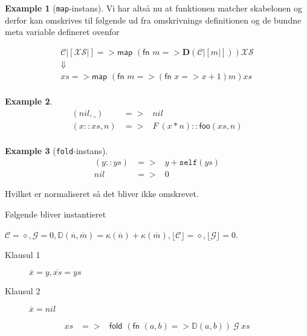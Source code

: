 \documentclass[oneside]{memoir}
\newcommand{\floor}[1]{\ensuremath{\lfloor #1 \rfloor}}
\theoremstyle{definition}
\newtheorem{example}{Example}
\begin{document}
\begin{example}[\texttt{map}-instans]
  Vi har altså nu at funktionen matcher skabelonen og derfor kan omskrives til
  følgende ud fra omskrivnings definitionen og de bundne meta variable defineret
  ovenfor

  \begin{eqnarray*}[c]
      \mathcal{C}|[\mathcal{X\!S}|] => \textsf{map } \left( \textsf{fn } m =>
    \mathbf{D}\left( \mathcal{C}|[m|] \right) \right) \mathcal{X\!S} \\
  \Downarrow \\
  xs => \textsf{map } \left( \textsf{fn } m =>
    \left( \textsf{fn } x => x + 1 \right) m \right) xs \\
  \end{eqnarray*}

\end{example}


\begin{example}
  \begin{eqnarray*}
    (nil, \_) &=>& nil\\
    (x::xs, n) &=>& F\ (x * n) :: \mathsf{foo} (xs, n)\\
  \end{eqnarray*}
\end{example}

\begin{example}[\texttt{fold}-instans]

  \begin{eqnarray*}
    (y::ys) &=>& y + \mathtt{self} \left( ys \right) \\
    nil &=>& 0
  \end{eqnarray*}

  Hvilket er normaliseret så det bliver ikke omskrevet.

  Følgende bliver instantieret

  $\mathcal{C} = \diamond, \mathcal{G} = 0, \mathbb{D}(\overline{n},
  \overline{m}) = \kappa(\overline{n}) + \kappa(\overline{m}),
  \floor{\mathcal{C}} = \diamond, \floor{\mathcal{G}} = 0$.

  

  \begin{description}
    \item[Klausul 1] $\overline{x} = y, \overline{xs} = ys$

    \item[Klausul 2] $\overline{x} = nil$
  \end{description}

  \begin{eqnarray*}
    xs &=>& \textsf{fold } \left( \textsf{fn } (a,b) => \mathbb{D}(a,b)
    \right) \ \mathcal{G} \ xs
  \end{eqnarray*}
  
\end{example}
\end{document}
